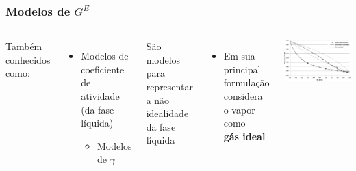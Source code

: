 \documentclass[aspectratio=169]{beamer}
\begin{document}
\begin{frame}
	\frametitle{Modelos de $G^E$}
	\begin{columns}[c]
		Também conhecidos como:
		\begin{itemize}
			\item Modelos de coeficiente de atividade (da fase líquida)
			\begin{itemize}
				\item Modelos de $\gamma$
			\end{itemize}
		\end{itemize}
		São modelos para representar a não idealidade da fase líquida
		\begin{itemize}
			\item Em sua principal formulação considera o vapor como \\
			\textbf{gás ideal}
		\end{itemize}
		\includegraphics[width=1.0\textwidth]{img/VLE_ideal.png}
	\end{columns}
\end{frame}
\end{document}
